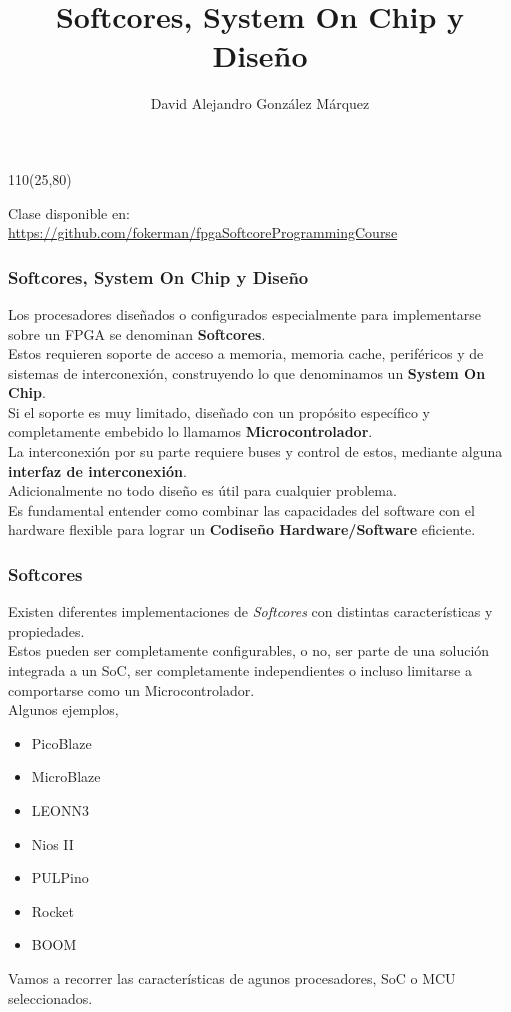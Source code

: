 \documentclass[aspectratio=169]{beamer}
\title{\Huge Softcores, System On Chip y Diseño}
\author{David Alejandro González Márquez}
\date{}
\begin{document}
\begin{frame}[plain]
    \titlepage
    \begin{textblock}{110}(25,80)
    \begin{tcolorbox}[size=small,width=\textwidth,colback={gray!30},title={}]
    \begin{center}
     \scriptsize Clase disponible en: \url{https://github.com/fokerman/fpgaSoftcoreProgrammingCourse}
    \end{center}
    \end{tcolorbox}
    \end{textblock}
\end{frame}

\begin{frame}[t,fragile]
    \frametitle{Softcores, System On Chip y Diseño}
    Los procesadores diseñados o configurados especialmente para implementarse sobre un FPGA se denominan \textbf{Softcores}.\\
    \bigskip
    \pause
    Estos requieren soporte de acceso a memoria, memoria cache, periféricos y de sistemas de interconexión, construyendo lo que denominamos un \textbf{System On Chip}.\\
    \bigskip
    \pause
    Si el soporte es muy limitado, diseñado con un propósito específico y completamente embebido lo llamamos \textbf{Microcontrolador}.\\
    \bigskip
    \pause
    La interconexión por su parte requiere buses y control de estos, mediante alguna \textbf{interfaz de interconexión}.\\
    \bigskip
    \pause
    Adicionalmente no todo diseño es útil para cualquier problema.\\
    Es fundamental entender como combinar las capacidades del software con el hardware flexible para lograr un \textbf{Codiseño Hardware/Software} eficiente.\\
\end{frame}

\begin{frame}[t,fragile]
    \frametitle{Softcores}
    Existen diferentes implementaciones de \emph{Softcores} con distintas características y propiedades.\\
    \small \textcolor{verdeuca}{Estos pueden ser completamente configurables, o no, ser parte de una solución integrada a un SoC, ser completamente independientes o incluso limitarse a comportarse como un Microcontrolador.}\\
    \bigskip
    \normalsize
    Algunos ejemplos,
    \begin{itemize}
        \item PicoBlaze
        \item MicroBlaze
        \item LEONN3
        \item Nios II
        \item PULPino
        \item Rocket
        \item BOOM
    \end{itemize}
    \bigskip
    \textcolor{verdeuca}{Vamos a recorrer las características de agunos procesadores, SoC o MCU seleccionados.}
\end{frame}
\end{document}

